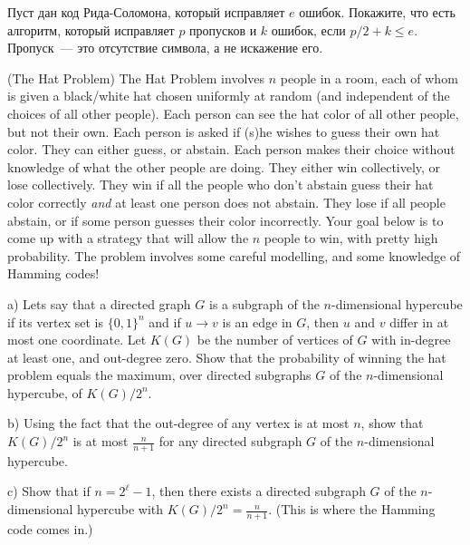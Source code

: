 \setcounter{curtask}{15}


\begin{task}
    Пуст дан код Рида-Соломона, который исправляет $e$ ошибок. Покажите, что есть
	алгоритм, который исправляет $p$ пропусков и $k$ ошибок, если $p / 2 + k \le e$.
    Пропуск~--- это отсутствие символа, а не искажение его.
\end{task}

\begin{task}(The Hat Problem)
	The Hat Problem involves $n$ people in a room, each of whom is given a
    black/white hat chosen uniformly at random (and independent of the choices of all
    other people). Each person can see the hat color of all other people, but not
    their own. Each person is asked if (s)he wishes to guess their own hat
    color. They can either guess, or abstain. Each person makes their choice without
    knowledge of what the other people are doing. They either win collectively, or
    lose collectively. They win if all the people who don't abstain guess their hat
    color correctly {\em and} at least one person does not abstain. They lose if all
    people abstain, or if some person guesses their color incorrectly.  Your goal
    below is to come up with a strategy that will allow the $n$ people to win, with
    pretty high probability. The problem involves some careful modelling, and some
    knowledge of Hamming codes!

	a) Lets say that a directed graph $G$ is a subgraph of the $n$-dimensional
    hypercube if its vertex set is $\{0, 1\}^n$ and if $u \to v$ is an edge in $G$,
    then $u$ and $v$ differ in at most one coordinate. Let $K(G)$ be the number of
    vertices of $G$ with in-degree at least one, and out-degree zero.  Show that the
    probability of winning the hat problem equals the maximum, over directed
    subgraphs $G$ of the $n$-dimensional hypercube, of $K(G) / 2^n$.

	b) Using the fact that the out-degree of any vertex is at most $n$, show that
	$K(G)/2^n$ is at most $\frac{n}{n+1}$ for any directed subgraph $G$ of the 
	$n$-dimensional hypercube.

	c) Show that if $n = 2^{\ell} - 1$, then there exists a directed subgraph $G$ of
    the $n$-dimensional hypercube with $K(G) / 2^n = \frac{n}{n + 1}$. (This is where
    the Hamming code comes in.)    
\end{task}

\breakline

